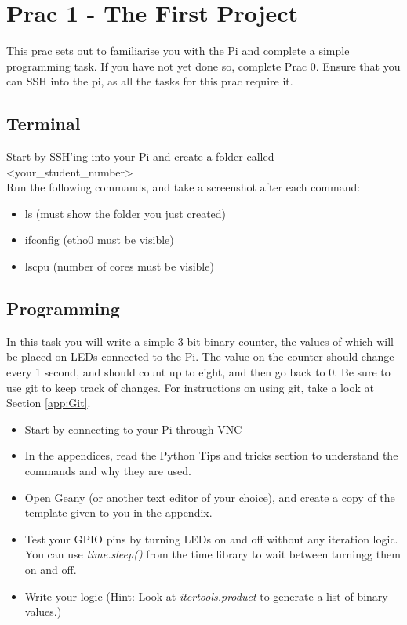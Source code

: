 \section{Prac 1 - The First Project}
This prac sets out to familiarise you with the Pi and complete a simple programming task. If you have not yet done so, complete Prac 0. Ensure that you can SSH into the pi, as all the tasks for this prac require it.


\subsection{Terminal}
\label{sec:Prac1:Terminal}
Start by SSH'ing into your Pi and create a folder called \textless your\_student\_number\textgreater\\
Run the following commands, and take a screenshot after each command:
\begin{itemize}
    \item ls (must show the folder you just created)
    \item ifconfig (etho0 must be visible)
    \item lscpu (number of cores must be visible)
\end{itemize}

\subsection{Programming}
In this task you will write a simple 3-bit binary counter, the values of which will be placed on LEDs connected to the Pi. The value on the counter should change every 1 second, and should count up to eight, and then go back to 0.
Be sure to use git to keep track of changes. For instructions on using git, take a look at Section \ref{app:Git}.
\begin{itemize}
    \item Start by connecting to your Pi through VNC
    \item In the appendices, read the Python Tips and tricks section to understand the commands and why they are used.
    \item Open Geany (or another text editor of your choice), and create a copy of the template given to you in the appendix.
    \item Test your GPIO pins by turning LEDs on and off without any iteration logic. You can use \textit{time.sleep()} from the time library to wait between turningg them on and off.
    \item Write your logic (Hint: Look at \textit{itertools.product} to generate a list of binary values.)
\end{itemize}

